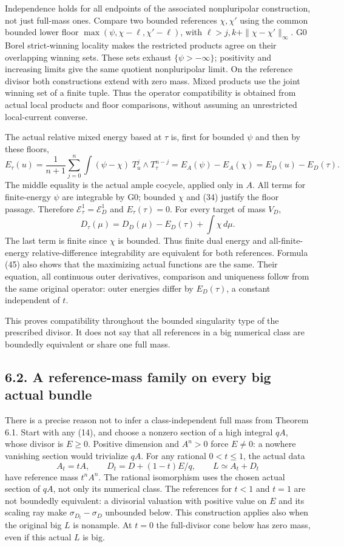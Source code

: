 \documentclass[
  10pt,
]{article}
\begin{document}
Independence holds for all endpoints of the associated nonpluripolar
construction, not just full-mass ones. Compare two bounded references
\(\chi,\chi'\) using the common bounded lower floor
\(\max(\psi,\chi-\ell,\chi'-\ell)\), with
\(\ell>j,k+\|\chi-\chi'\|_\infty\). G0 Borel strict-winning locality
makes the restricted products agree on their overlapping winning sets.
These sets exhaust \(\{\psi>-\infty\}\); positivity and increasing
limits give the same quotient nonpluripolar limit. On the reference
divisor both constructions extend with zero mass. Mixed products use the
joint winning set of a finite tuple. Thus the operator compatibility is
obtained from actual local products and floor comparisons, without
assuming an unrestricted local-current converse.

The actual relative mixed energy based at \(\tau\) is, first for bounded
\(\psi\) and then by these floors, \[E_\tau(u)=\frac1{n+1}\sum_{j=0}^n
\int(\psi-\chi)\;T_u^j\wedge T_\tau^{n-j}
=E_A(\psi)-E_A(\chi)=E_D(u)-E_D(\tau).\tag{44}\] The middle equality is
the actual ample cocycle, applied only in \(A\). All terms for
finite-energy \(\psi\) are integrable by G0; bounded \(\chi\) and (34)
justify the floor passage. Therefore
\(\mathcal E^1_\tau=\mathcal E^1_D\) and \(E_\tau(\tau)=0\). For every
target of mass \(V_D\),
\[D_\tau(\mu)=D_D(\mu)-E_D(\tau)+\int\chi\,d\mu.\tag{45}\] The last term
is finite since \(\chi\) is bounded. Thus finite dual energy and
all-finite-energy relative-difference integrability are equivalent for
both references. Formula (45) also shows that the maximizing actual
functions are the same. Their equation, all continuous outer
derivatives, comparison and uniqueness follow from the same original
operator: outer energies differ by \(E_D(\tau)\), a constant independent
of \(t\).

This proves compatibility throughout the bounded singularity type of the
prescribed divisor. It does not say that all references in a big
numerical class are boundedly equivalent or share one full mass.

\subsection{6.2. A reference-mass family on every big actual
bundle}\label{a-reference-mass-family-on-every-big-actual-bundle}

There is a precise reason not to infer a class-independent full mass
from Theorem 6.1. Start with any (14), and choose a nonzero section of a
high integral \(qA\), whose divisor is \(E\geq0\). Positive dimension
and \(A^n>0\) force \(E\ne0\): a nowhere vanishing section would
trivialize \(qA\). For any rational \(0<t\leq1\), the actual data
\[A_t=tA,\qquad D_t=D+(1-t)E/q,\qquad L\simeq A_t+D_t\tag{46}\] have
reference mass \(t^n A^n\). The rational isomorphism uses the chosen
actual section of \(qA\), not only its numerical class. The references
for \(t<1\) and \(t=1\) are not boundedly equivalent: a divisorial
valuation with positive value on \(E\) and its scaling ray make
\(\sigma_{D_t}-\sigma_D\) unbounded below. This construction applies
also when the original big \(L\) is nonample. At \(t=0\) the
full-divisor cone below has zero mass, even if this actual \(L\) is big.
\end{document}

